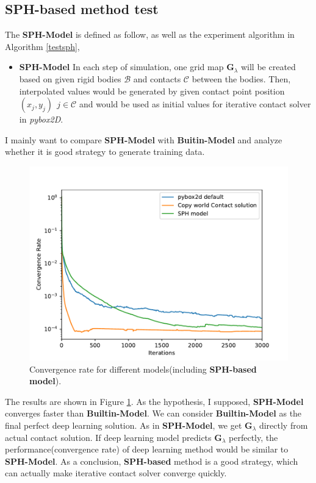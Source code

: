 \subsection{SPH-based method test}
    \label{sphtest}
    The \textbf{SPH-Model} is defined as follow, as well as the experiment algorithm in Algorithm \ref{testsph},
    \begin{itemize}
         \item \textbf{SPH-Model} In each step of simulation, one grid map $\pmb{G}_{\lambda}$ will be created based on given rigid bodies $\mathcal{B}$ and contacts $\mathcal{C}$ between the bodies. Then, interpolated values would be generated by given contact point position $(x_j, y_j)~~j \in \mathcal{C}$ and would be used as initial values for iterative contact solver in \textit{pybox2D}. 
    \end{itemize}
    I mainly want to compare \textbf{SPH-Model} with \textbf{Buitin-Model} and analyze whether it is good strategy to generate training data.
     \begin{figure}[!h]
        \centering
        \includegraphics[width=\textwidth]{Figures/addsph}
        \caption{Convergence rate for different models(including \textbf{SPH-based model}).}
        \label{fg:addsph}
    \end{figure}

    The results are shown in Figure \ref{fg:addsph}. As the hypothesis, I supposed, \textbf{SPH-Model} converges faster than \textbf{Builtin-Model}. We can consider \textbf{Builtin-Model} as the final perfect deep learning solution. As in \textbf{SPH-Model}, we get $\pmb{G}_{\lambda}$ directly from actual contact solution. If deep learning model predicts $\pmb{G}_{\lambda}$ perfectly, the performance(convergence rate) of deep learning method would be similar to \textbf{SPH-Model}. As a conclusion, \textbf{SPH-based} method is a good strategy, which can actually make iterative contact solver converge quickly.

